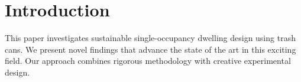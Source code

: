 \section{Introduction}

This paper investigates sustainable single-occupancy dwelling design using trash cans. We present novel findings that advance the state of the art in this exciting field. Our approach combines rigorous methodology with creative experimental design.
